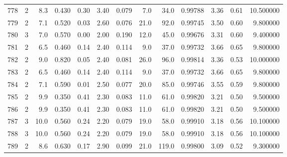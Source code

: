 \begin{tabular}{lrrrrrrrrrrrr}
778  &        2 &            8.3 &             0.430 &         0.30 &            3.40 &      0.079 &                  7.0 &                  34.0 &  0.99788 &  3.36 &       0.61 &  10.500000 \\
779  &        2 &            7.1 &             0.520 &         0.03 &            2.60 &      0.076 &                 21.0 &                  92.0 &  0.99745 &  3.50 &       0.60 &   9.800000 \\
780  &        3 &            7.0 &             0.570 &         0.00 &            2.00 &      0.190 &                 12.0 &                  45.0 &  0.99676 &  3.31 &       0.60 &   9.400000 \\
781  &        2 &            6.5 &             0.460 &         0.14 &            2.40 &      0.114 &                  9.0 &                  37.0 &  0.99732 &  3.66 &       0.65 &   9.800000 \\
782  &        2 &            9.0 &             0.820 &         0.05 &            2.40 &      0.081 &                 26.0 &                  96.0 &  0.99814 &  3.36 &       0.53 &  10.000000 \\
783  &        2 &            6.5 &             0.460 &         0.14 &            2.40 &      0.114 &                  9.0 &                  37.0 &  0.99732 &  3.66 &       0.65 &   9.800000 \\
784  &        2 &            7.1 &             0.590 &         0.01 &            2.50 &      0.077 &                 20.0 &                  85.0 &  0.99746 &  3.55 &       0.59 &   9.800000 \\
785  &        2 &            9.9 &             0.350 &         0.41 &            2.30 &      0.083 &                 11.0 &                  61.0 &  0.99820 &  3.21 &       0.50 &   9.500000 \\
786  &        2 &            9.9 &             0.350 &         0.41 &            2.30 &      0.083 &                 11.0 &                  61.0 &  0.99820 &  3.21 &       0.50 &   9.500000 \\
787  &        3 &           10.0 &             0.560 &         0.24 &            2.20 &      0.079 &                 19.0 &                  58.0 &  0.99910 &  3.18 &       0.56 &  10.100000 \\
788  &        3 &           10.0 &             0.560 &         0.24 &            2.20 &      0.079 &                 19.0 &                  58.0 &  0.99910 &  3.18 &       0.56 &  10.100000 \\
789  &        2 &            8.6 &             0.630 &         0.17 &            2.90 &      0.099 &                 21.0 &                 119.0 &  0.99800 &  3.09 &       0.52 &   9.300000 \\

\end{tabular}
